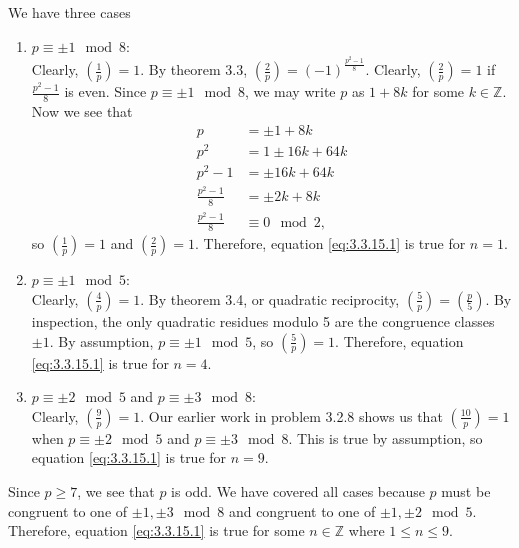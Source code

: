 \documentclass[12 pt]{amsart}
\begin{document}
  We have three cases
  \begin{enumerate}[1.]
    \item $p \equiv \pm 1 \mod 8$: \\
      Clearly,
      $\left( \frac{1}{p} \right) = 1$.
      By theorem 3.3, 
      $\left( \frac{2}{p} \right) = (-1)^{\frac{p^2-1}{8}}$.
      Clearly, 
      $\left( \frac{2}{p} \right) = 1$ 
      if 
      $\frac{p^2-1}{8}$ is even.
      Since $p \equiv \pm 1 \mod 8$, we may write $p$ as
      $1 + 8k$ for some $k \in \mathbb{Z}$.
      Now we see that
      \begin{align*}
        p &= \pm 1 + 8k \\
        p^2 &= 1 \pm 16k + 64k \\
        p^2 - 1 &= \pm 16k + 64k \\
        \frac{p^2 - 1}{8} &= \pm 2k + 8k \\
        \frac{p^2 - 1}{8} &\equiv 0 \mod 2,
      \end{align*}
      so
      $\left( \frac{1}{p} \right) = 1$
      and 
      $\left( \frac{2}{p} \right) = 1$.
      Therefore, equation \ref{eq:3.3.15.1} is true for $n = 1$.
    \item $p \equiv \pm 1 \mod 5$:  \\
      Clearly, 
      $\left( \frac{4}{p} \right) = 1$.
      By theorem 3.4, or quadratic reciprocity,
      $\left( \frac{5}{p} \right) = \left( \frac{p}{5} \right)$.
      By inspection, the only quadratic residues modulo 5
      are the congruence classes $\pm 1$.
      By assumption, $p \equiv \pm 1 \mod 5$, so 
      $\left( \frac{5}{p} \right) = 1$. 
      Therefore, equation \ref{eq:3.3.15.1} is true for $n = 4$.
    \item $p \equiv \pm 2 \mod 5$ and $p \equiv \pm 3 \mod 8$: \\
      Clearly, 
      $\left( \frac{9}{p} \right) = 1$.
      Our earlier work in problem 3.2.8 shows us that
      $\left( \frac{10}{p} \right) = 1$
      when $p \equiv \pm 2 \mod 5$ and $p \equiv \pm 3 \mod 8$.
      This is true by assumption, so equation 
      \ref{eq:3.3.15.1} is true for $n = 9$.
  \end{enumerate}
  Since $p \geq 7$, we see that $p$ is odd.
  We have covered all cases because $p$ must be congruent to one of
  $\pm 1, \pm 3 \mod 8$ and congruent to one of 
  $\pm 1, \pm 2 \mod 5$.
  Therefore, equation \ref{eq:3.3.15.1} is true for some 
  $n \in \mathbb{Z}$ 
  where
  $1 \leq n \leq 9$.
\vfill
\newpage
\end{document}
